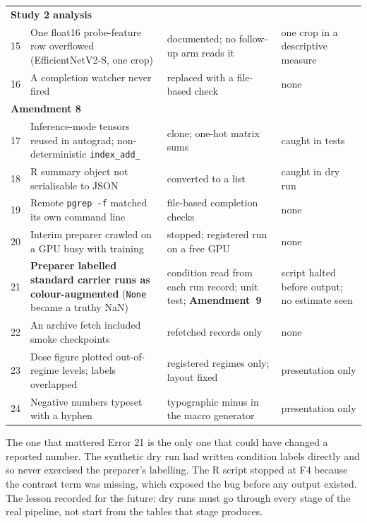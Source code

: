 {\begin{longtable}{p{}p{}p{}p{}}
\multicolumn{4}{l}{\textbf{Study 2 analysis}} \\
15 & One float16 probe-feature row overflowed (EfficientNetV2-S, one crop) & documented; no follow-up arm reads it & one crop in a descriptive measure \\
16 & A completion watcher never fired & replaced with a file-based check & none \\
\multicolumn{4}{l}{\textbf{Amendment 8}} \\
17 & Inference-mode tensors reused in autograd; non-deterministic \texttt{index\_add\_} & clone; one-hot matrix sums & caught in tests \\
18 & R summary object not serialisable to JSON & converted to a list & caught in dry run \\
19 & Remote \texttt{pgrep -f} matched its own command line & file-based completion checks & none \\
20 & Interim preparer crawled on a GPU busy with training & stopped; registered run on a free GPU & none \\
21 & \textbf{Preparer labelled standard carrier runs as colour-augmented} (\texttt{None} became a truthy NaN) & condition read from each run record; unit test; \textbf{Amendment~9} & script halted before output; no estimate seen \\
22 & An archive fetch included smoke checkpoints & refetched records only & none \\
23 & Dose figure plotted out-of-regime levels; labels overlapped & registered regimes only; layout fixed & presentation only \\
24 & Negative numbers typeset with a hyphen & typographic minus in the macro generator & presentation only \\
\end{longtable}
}

\begin{warningbox}{The one that mattered}
Error 21 is the only one that could have changed a reported number. The synthetic dry run had written condition
labels directly and so never exercised the preparer's labelling. The R script stopped at F4 because the contrast term was
missing, which exposed the bug before any output existed. The lesson recorded for the future: dry runs must go through
every stage of the real pipeline, not start from the tables that stage produces.
\end{warningbox}
